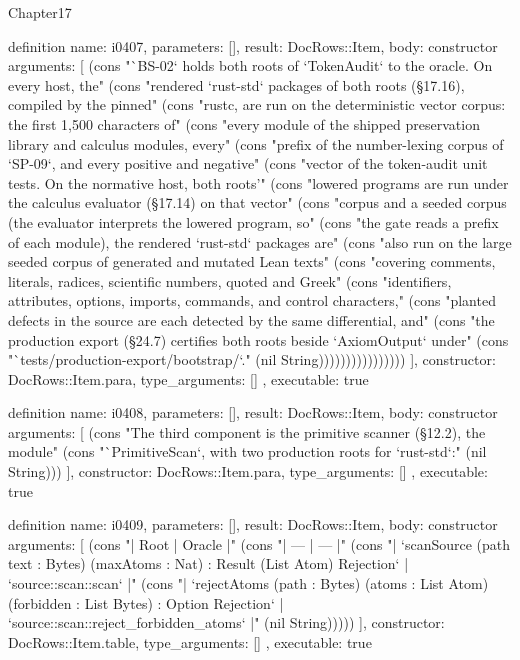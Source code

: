 \begin{lexlean}{Chapter17}
\begin{semanticmodule}
definition{
  name: i0407,
  parameters: [],
  result: DocRows::Item,
  body: constructor{
    arguments: [
      (cons "`BS-02` holds both roots of `TokenAudit` to the oracle. On every host, the" (cons "rendered `rust-std` packages of both roots (§17.16), compiled by the pinned" (cons "rustc, are run on the deterministic vector corpus: the first 1,500 characters of" (cons "every module of the shipped preservation library and calculus modules, every" (cons "prefix of the number-lexing corpus of `SP-09`, and every positive and negative" (cons "vector of the token-audit unit tests. On the normative host, both roots'" (cons "lowered programs are run under the calculus evaluator (§17.14) on that vector" (cons "corpus and a seeded corpus (the evaluator interprets the lowered program, so" (cons "the gate reads a prefix of each module), the rendered `rust-std` packages are" (cons "also run on the large seeded corpus of generated and mutated Lean texts" (cons "covering comments, literals, radices, scientific numbers, quoted and Greek" (cons "identifiers, attributes, options, imports, commands, and control characters," (cons "planted defects in the source are each detected by the same differential, and" (cons "the production export (§24.7) certifies both roots beside `AxiomOutput` under" (cons "`tests/production-export/bootstrap/`." (nil String))))))))))))))))
    ],
    constructor: DocRows::Item.para,
    type_arguments: []
  },
  executable: true
}

definition{
  name: i0408,
  parameters: [],
  result: DocRows::Item,
  body: constructor{
    arguments: [
      (cons "The third component is the primitive scanner (§12.2), the module" (cons "`PrimitiveScan`, with two production roots for `rust-std`:" (nil String)))
    ],
    constructor: DocRows::Item.para,
    type_arguments: []
  },
  executable: true
}

definition{
  name: i0409,
  parameters: [],
  result: DocRows::Item,
  body: constructor{
    arguments: [
      (cons "| Root | Oracle |" (cons "| --- | --- |" (cons "| `scanSource (path text : Bytes) (maxAtoms : Nat) : Result (List Atom) Rejection` | `source::scan::scan` |" (cons "| `rejectAtoms (path : Bytes) (atoms : List Atom) (forbidden : List Bytes) : Option Rejection` | `source::scan::reject_forbidden_atoms` |" (nil String)))))
    ],
    constructor: DocRows::Item.table,
    type_arguments: []
  },
  executable: true
}


\end{semanticmodule}
\end{lexlean}
